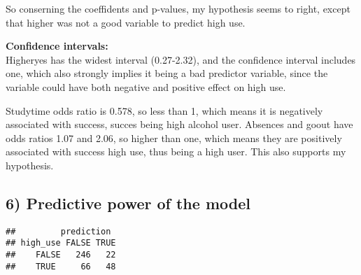 \documentclass[]{article}
\newenvironment{Shaded}{\begin{snugshade}}{\end{snugshade}}
\newcommand{\KeywordTok}[1]{\textcolor[rgb]{0.13,0.29,0.53}{\textbf{#1}}}
\newcommand{\DataTypeTok}[1]{\textcolor[rgb]{0.13,0.29,0.53}{#1}}
\newcommand{\FloatTok}[1]{\textcolor[rgb]{0.00,0.00,0.81}{#1}}
\newcommand{\StringTok}[1]{\textcolor[rgb]{0.31,0.60,0.02}{#1}}
\newcommand{\CommentTok}[1]{\textcolor[rgb]{0.56,0.35,0.01}{\textit{#1}}}
\newcommand{\OperatorTok}[1]{\textcolor[rgb]{0.81,0.36,0.00}{\textbf{#1}}}
\newcommand{\NormalTok}[1]{#1}
\begin{document}
So conserning the coeffidents and p-values, my hypothesis seems to
right, except that higher was not a good variable to predict high use.

\textbf{Confidence intervals:}\\
Higheryes has the widest interval (0.27-2.32), and the confidence
interval includes one, which also strongly implies it being a bad
predictor variable, since the variable could have both negative and
positive effect on high use.

Studytime odds ratio is 0.578, so less than 1, which means it is
negatively associated with success, succes being high alcohol user.
Absences and goout have odds ratios 1.07 and 2.06, so higher than one,
which means they are positively associated with success high use, thus
being a high user. This also supports my hypothesis.

\subsection{6) Predictive power of the
model}\label{predictive-power-of-the-model}

\begin{Shaded}
\end{Shaded}

\begin{verbatim}
##         prediction
## high_use FALSE TRUE
##    FALSE   246   22
##    TRUE     66   48
\end{verbatim}
\end{document}
